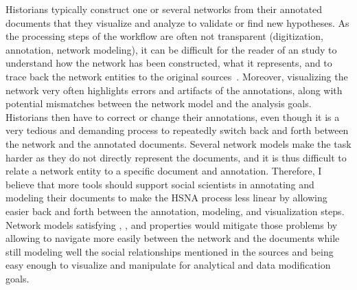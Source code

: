 

Historians typically construct one or several networks from their annotated documents that they visualize and analyze to validate or find new hypotheses.
As the processing steps of the workflow are often not transparent (digitization, annotation, network modeling), it can be difficult for the reader of an \hsna study to understand how the network has been constructed, what it represents, and to trace back the network entities to the original sources~\cite{dufournaudCommentRendreVisible2018}.
Moreover, visualizing the network very often highlights errors and artifacts of the annotations, along with potential mismatches between the network model and the analysis goals.
Historians then have to correct or change their annotations, even though it is a very tedious and demanding process to repeatedly switch back and forth between the network and the annotated documents.
Several network models make the task harder as they do not directly represent the documents, and it is thus difficult to relate a network entity to a specific document and annotation.
Therefore, I believe that more \va tools should support social scientists in annotating and modeling their documents to make the HSNA process less linear by allowing easier back and forth between the annotation, modeling, and visualization steps.
Network models satisfying  \traceability, \reality, and \simplicity properties would mitigate those problems by allowing to navigate more easily between the network and the documents while still modeling well the social relationships mentioned in the sources and being easy enough to visualize and manipulate for analytical and data modification goals.


